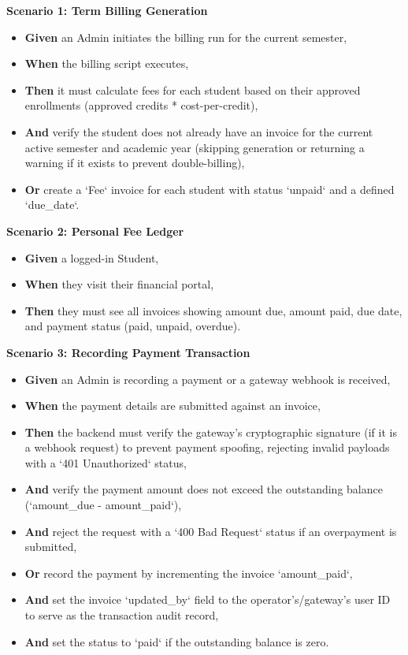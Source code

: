 \noindent\textbf{Scenario 1: Term Billing Generation}\\
\begin{itemize}
  \item \textbf{Given} an Admin initiates the billing run for the current semester,
  \item \textbf{When} the billing script executes,
  \item \textbf{Then} it must calculate fees for each student based on their approved enrollments (approved credits * cost-per-credit),
  \item \textbf{And} verify the student does not already have an invoice for the current active semester and academic year (skipping generation or returning a warning if it exists to prevent double-billing),
  \item \textbf{Or} create a `Fee` invoice for each student with status `unpaid` and a defined `due\_date`.
\end{itemize}


\noindent\textbf{Scenario 2: Personal Fee Ledger}\\
\begin{itemize}
  \item \textbf{Given} a logged-in Student,
  \item \textbf{When} they visit their financial portal,
  \item \textbf{Then} they must see all invoices showing amount due, amount paid, due date, and payment status (paid, unpaid, overdue).
\end{itemize}


\noindent\textbf{Scenario 3: Recording Payment Transaction}\\
\begin{itemize}
  \item \textbf{Given} an Admin is recording a payment or a gateway webhook is received,
  \item \textbf{When} the payment details are submitted against an invoice,
  \item \textbf{Then} the backend must verify the gateway's cryptographic signature (if it is a webhook request) to prevent payment spoofing, rejecting invalid payloads with a `401 Unauthorized` status,
  \item \textbf{And} verify the payment amount does not exceed the outstanding balance (`amount\_due - amount\_paid`),
  \item \textbf{And} reject the request with a `400 Bad Request` status if an overpayment is submitted,
  \item \textbf{Or} record the payment by incrementing the invoice `amount\_paid`,
  \item \textbf{And} set the invoice `updated\_by` field to the operator's/gateway's user ID to serve as the transaction audit record,
  \item \textbf{And} set the status to `paid` if the outstanding balance is zero.
\end{itemize}


